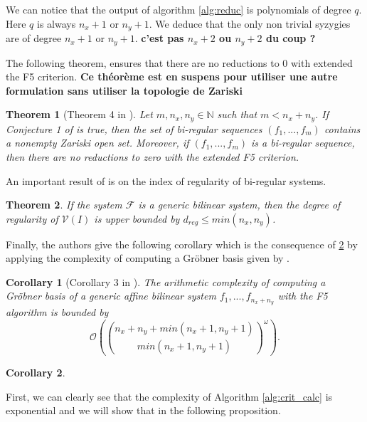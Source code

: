 \documentclass[english]{article}
\newtheorem{theorem}{Theorem}[section]
\newtheorem{corollary}{Corollary}[section]
\begin{document}
		We can notice that the output of algorithm \ref{alg:reduc} is polynomials of degree $q$. Here $q$ is always $n_x + 1$ or $n_y + 1$. We deduce that the only non trivial syzygies are of degree $n_x + 1$ or $n_y + 1$. \textbf{c'est pas $n_x + 2$ ou $n_y + 2$ du coup ?}
		
		The following theorem, ensures that there are no reductions to 0 with extended the F5 criterion. \textbf{Ce théorème est en suspens pour utiliser une autre formulation sans utiliser la topologie de Zariski}
		
		\begin{theorem}[Theorem 4 in \cite{FSS11}]
			Let $m, n_x, n_y \in \mathbb{N}$ such that $m < n_x + n_y$. If Conjecture 1 of \cite{FSS11} is true, then the set of bi-regular sequences $(f_1,...,f_m)$ contains a nonempty Zariski open set. Moreover, if $(f_1,...,f_m)$ is a bi-regular sequence, then there are no reductions to zero with the extended F5 criterion.
		\end{theorem}
		
		An important result of \cite{FSS11} is on the index of regularity of bi-regular systems.
		
		\begin{theorem}\label{reg_bi}
			If the system $\mathcal{F}$ is a generic bilinear system, then the degree of regularity of $\mathcal{V}(I)$ is upper bounded by $d_{reg} \leq min(n_x, n_y)$.
		\end{theorem}
		
		Finally, the authors give the following corollary which is the consequence of \ref{reg_bi} by applying the complexity of computing a Gröbner basis given by \cite{Bardet04}.
		
		\begin{corollary}[Corollary 3 in \cite{FSS11}]\label{complex_bi}
			The arithmetic complexity of computing a Gröbner basis of a generic affine bilinear system $f_1,...,f_{n_x + n_y}$ with the F5 algorithm is bounded by
			$$\mathcal{O}\left(\binom{n_x + n_y + min(n_x + 1, n_y + 1)}{min(n_x + 1, n_y + 1)}^\omega\right).$$
		\end{corollary}
		
		\begin{corollary}
			
		\end{corollary}
		
		First, we can clearly see that the complexity of Algorithm \ref{alg:crit_calc} is exponential and we will show that in the following proposition.
		
\end{document}
